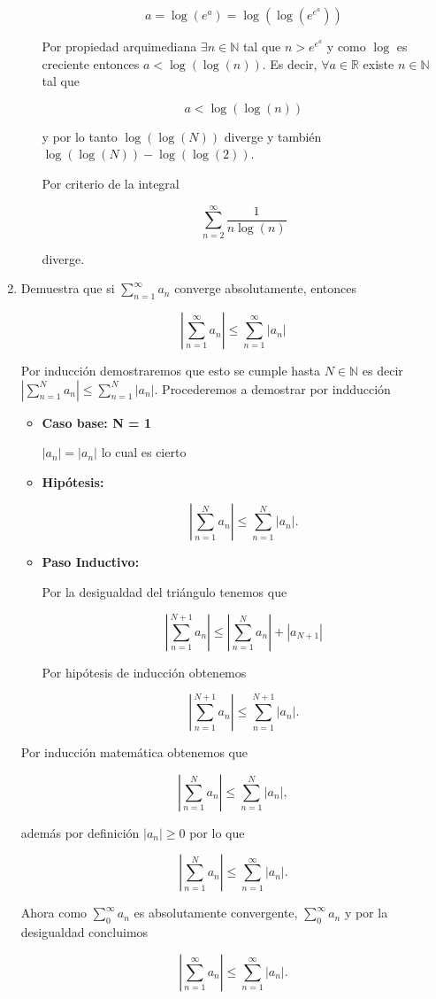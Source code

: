 \documentclass[letterpaper]{article}
\theoremstyle{definition}
\theoremstyle{lemathm}
\theoremstyle{lemademthm}
\newcommand{\N}{\mathbb{N}}
\newcommand{\R}{\mathbb{R}}
\begin{document}
\begin{enumerate}
\begin{enumerate}
			\[a = \log(e^a) = \log(\log(e^{e^a}))\]

			Por propiedad arquimediana $\exists n \in \N$ tal que $n > e^{e^a}$ y como $\log$ es creciente entonces $a < \log(\log(n))$. Es decir, $\forall a \in \R$ existe $n\in\N$ tal que

			\[a < \log(\log(n))\]

			y por lo tanto $\log(\log(N))$ diverge y también $\log(\log(N)) - \log(\log(2))$.

			Por criterio de la integral

			\[\sum_{n=2}^{\infty} \frac{1}{n\log(n)}\]

			diverge.

		\end{enumerate}

		\item Demuestra que si $\sum_{n=1}^\infty a_n$ converge absolutamente, entonces
		
		\[\left|\sum_{n=1}^{\infty} a_n\right| \leq \sum_{n=1}^{\infty} |a_n|\]

		Por inducción demostraremos que esto se cumple hasta $N \in \N$ es decir $\left|\sum_{n=1}^{N} a_n\right| \leq \sum_{n=1}^{N} |a_n|$. Procederemos a demostrar por indducción

		\begin{itemize}
			\item \textbf{Caso base: N = 1}
			
			$|a_n| = |a_n|$ lo cual es cierto

			\item \textbf{Hipótesis:}
			
			\[\left|\sum_{n=1}^{N} a_n\right| \leq \sum_{n=1}^{N} |a_n|.\]

			\item \textbf{Paso Inductivo:}
			
			Por la desigualdad del triángulo tenemos que

			\[\left|\sum_{n=1}^{N+1} a_n\right| \leq \left|\sum_{n=1}^{N} a_n\right| + |a_{N+1}|\]

			Por hipótesis de inducción obtenemos

			\[\left|\sum_{n=1}^{N+1} a_n\right| \leq \sum_{n=1}^{N+1} |a_n|.\]

		\end{itemize}

		Por inducción matemática obtenemos que

		\[\left|\sum_{n=1}^{N} a_n\right| \leq \sum_{n=1}^{N} |a_n|,\]

		además por definición $|a_n| \geq 0$ por lo que

		\[\left|\sum_{n=1}^{N} a_n\right| \leq \sum_{n=1}^{\infty} |a_n|.\]

		Ahora como $\sum_{0}^{\infty} a_n$ es absolutamente convergente, $\sum_{0}^{\infty} a_n$ y por la desigualdad concluimos

		\[\left|\sum_{n=1}^{\infty} a_n\right| \leq \sum_{n=1}^{\infty} |a_n|.\]

	\end{enumerate}
	
\end{document}
